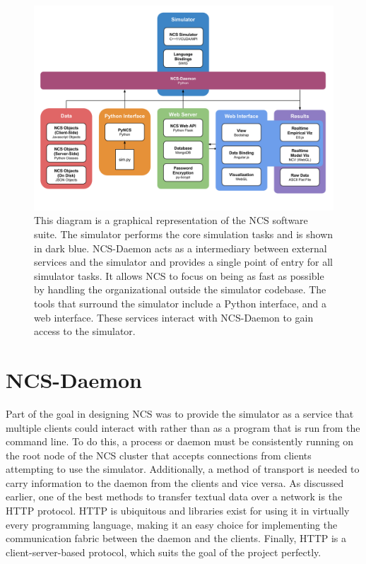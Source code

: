 \begin{figure}
\begin{center}
\includegraphics[height=\textheight,width=6in,keepaspectratio]{figures/ncs_architecture.png}
\caption[NCS Architecture]{This diagram is a graphical representation of the NCS software suite. The simulator performs the core simulation tasks and is shown in dark blue. NCS-Daemon acts as a intermediary between external services and the simulator and provides a single point of entry for all simulator tasks. It allows NCS to focus on being as fast as possible by handling the organizational outside the simulator codebase. The tools that surround the simulator include a Python interface, and a web interface. These services interact with NCS-Daemon to gain access to the simulator.\label{fig:ncs_architecture}}
\end{center}
\end{figure}

\section{NCS-Daemon}

Part of the goal in designing NCS was to provide the simulator as a service that multiple clients could interact with rather than as a program that is run from the command line. To do this, a process or daemon must be consistently running on the root node of the NCS cluster that accepts connections from clients attempting to use the simulator. Additionally, a method of transport is needed to carry information to the daemon from the clients and vice versa. As discussed earlier, one of the best methods to transfer textual data over a network is the HTTP protocol. HTTP is ubiquitous and libraries exist for using it in virtually every programming language, making it an easy choice for implementing the communication fabric between the daemon and the clients. Finally, HTTP is a client-server-based protocol, which suits the goal of the project perfectly.

